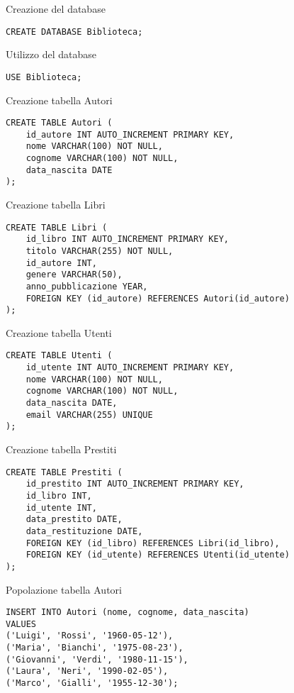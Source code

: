 \begin{frame}[fragile]{Creazione del database}
\begin{lstlisting}
CREATE DATABASE Biblioteca;
\end{lstlisting}
\end{frame}
%
\begin{frame}[fragile]{Utilizzo del database}
\begin{lstlisting}
USE Biblioteca;
\end{lstlisting}
\end{frame}
%
\begin{frame}[fragile]{Creazione tabella Autori}
\begin{lstlisting}
CREATE TABLE Autori (
    id_autore INT AUTO_INCREMENT PRIMARY KEY,
    nome VARCHAR(100) NOT NULL,
    cognome VARCHAR(100) NOT NULL,
    data_nascita DATE
);
\end{lstlisting}
\end{frame}
%
\begin{frame}[fragile]{Creazione tabella Libri}
\begin{lstlisting}
CREATE TABLE Libri (
    id_libro INT AUTO_INCREMENT PRIMARY KEY,
    titolo VARCHAR(255) NOT NULL,
    id_autore INT,
    genere VARCHAR(50),
    anno_pubblicazione YEAR,
    FOREIGN KEY (id_autore) REFERENCES Autori(id_autore)
);
\end{lstlisting}
\end{frame}
%
\begin{frame}[fragile]{Creazione tabella Utenti}
\begin{lstlisting}
CREATE TABLE Utenti (
    id_utente INT AUTO_INCREMENT PRIMARY KEY,
    nome VARCHAR(100) NOT NULL,
    cognome VARCHAR(100) NOT NULL,
    data_nascita DATE,
    email VARCHAR(255) UNIQUE
);
\end{lstlisting}
\end{frame}
%
\begin{frame}[fragile]{Creazione tabella Prestiti}
\begin{lstlisting}
CREATE TABLE Prestiti (
    id_prestito INT AUTO_INCREMENT PRIMARY KEY,
    id_libro INT,
    id_utente INT,
    data_prestito DATE,
    data_restituzione DATE,
    FOREIGN KEY (id_libro) REFERENCES Libri(id_libro),
    FOREIGN KEY (id_utente) REFERENCES Utenti(id_utente)
);
\end{lstlisting}
\end{frame}
%
\begin{frame}[fragile]{Popolazione tabella Autori}
\begin{lstlisting}
INSERT INTO Autori (nome, cognome, data_nascita)
VALUES 
('Luigi', 'Rossi', '1960-05-12'),
('Maria', 'Bianchi', '1975-08-23'),
('Giovanni', 'Verdi', '1980-11-15'),
('Laura', 'Neri', '1990-02-05'),
('Marco', 'Gialli', '1955-12-30');        
\end{lstlisting}
\end{frame}

